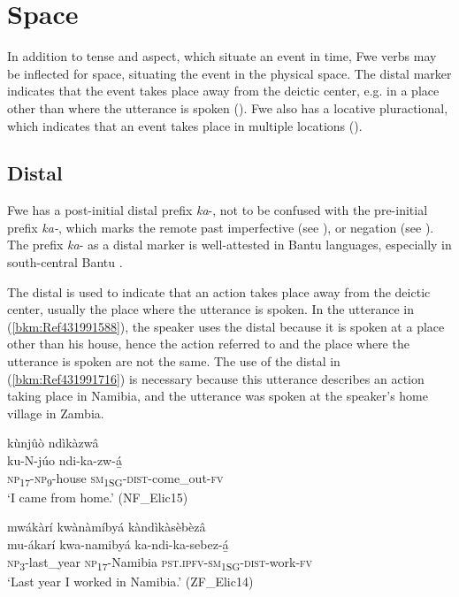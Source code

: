 \chapter{Space}
\hypertarget{Toc75352703}{}
In addition to tense and aspect, which situate an event in time, Fwe verbs may be inflected for space, situating the event in the physical space. The distal marker indicates that the event takes place away from the deictic center, e.g. in a place other than where the utterance is spoken (). Fwe also has a locative pluractional, which indicates that an event takes place in multiple locations ().

\section{Distal}
\label{bkm:Ref489965878}\hypertarget{Toc75352704}{}
Fwe has a post-initial distal prefix \textit{ka}-, not to be confused with the pre-initial prefix \textit{ka-}, which marks the remote past imperfective (see ), or negation (see ). The prefix \textit{ka}- as a distal marker is well-attested in Bantu languages, especially in south-central Bantu \citep{Botne1999}.

The distal is used to indicate that an action takes place away from the deictic center, usually the place where the utterance is spoken. In the utterance in (\ref{bkm:Ref431991588}), the speaker uses the distal because it is spoken at a place other than his house, hence the action referred to and the place where the utterance is spoken are not the same. The use of the distal in (\ref{bkm:Ref431991716}) is necessary because this utterance describes an action taking place in Namibia, and the utterance was spoken at the speaker’s home village in Zambia.

\ea
\label{bkm:Ref431991588}
kùnjûò ndìkàzwâ\\
\gll ku-N-júo    ndi-ka-zw-á̲\\
\textsc{np}\textsubscript{17}-\textsc{np}\textsubscript{9}-house  \textsc{sm}\textsubscript{1SG}-\textsc{dist}-come\_out-\textsc{fv}\\
\glt ‘I came from home.’ (NF\_Elic15)
\z

\ea
\label{bkm:Ref431991716}
mwákàrí kwànàmíbyá kàndìkàsèbèzâ\\
\gll mu-ákarí  kwa-namibyá  ka-ndi-ka-sebez-á̲\\
\textsc{np}\textsubscript{3}-last\_year  \textsc{np}\textsubscript{17}-Namibia  \textsc{pst}.\textsc{ipfv}-\textsc{sm}\textsubscript{1SG}-\textsc{dist}-work-\textsc{fv}\\
\glt ‘Last year I worked in Namibia.’ (ZF\_Elic14)
\z

